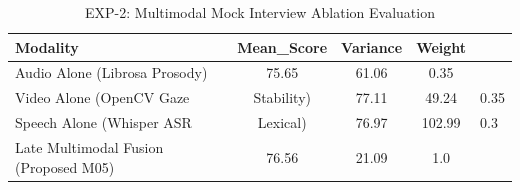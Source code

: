 \begin{table}[htbp]
\centering
\caption{EXP-2: Multimodal Mock Interview Ablation Evaluation}
\label{tab:exp2_interview_ablation}
\begin{tabular}{lccc}
\toprule
Modality & Mean\_Score & Variance & Weight \\
\midrule
Audio Alone (Librosa Prosody) & 75.65 & 61.06 & 0.35 \\
Video Alone (OpenCV Gaze & Stability) & 77.11 & 49.24 & 0.35 \\
Speech Alone (Whisper ASR & Lexical) & 76.97 & 102.99 & 0.3 \\
Late Multimodal Fusion (Proposed M05) & 76.56 & 21.09 & 1.0 \\
\bottomrule
\end{tabular}
\end{table}
